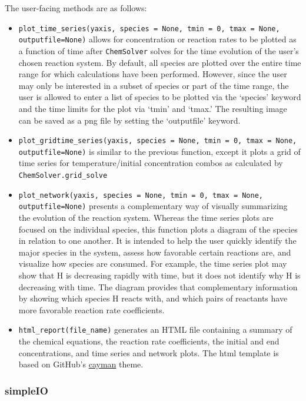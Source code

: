 \documentclass[12pt]{article}
\begin{document}
The user-facing methods are as follows: 
\begin{itemize}
\item \texttt{plot\_time\_series(yaxis, species = None, tmin = 0, tmax = None, outputfile=None)} allows for concentration or reaction rates to be plotted as a function of time after \texttt{ChemSolver} solves for the time evolution of the user's chosen reaction system. By default, all species are plotted over the entire time range for which calculations have been performed. However, since the user may only be interested in a subset of species or part of the time range, the user is allowed to enter a list of species to be plotted via the `species' keyword and the time limits for the plot via `tmin' and `tmax.' The resulting image can be saved as a png file by setting the `outputfile' keyword. 
\item \texttt{plot\_gridtime\_series(yaxis, species = None, tmin = 0, tmax = None, outputfile=None)} is similar to the previous function, except it plots a grid of time series for temperature/initial concentration combos as calculated by \texttt{ChemSolver.grid\_solve}
\item \texttt{plot\_network(yaxis, species = None, tmin = 0, tmax = None, outputfile=None)} presents a complementary way of visually summarizing the evolution of the reaction system. Whereas the time series plots are focused on the individual species, this function plots a diagram of the species in relation to one another. It is intended to help the user quickly identify the major species in the system, assess how favorable certain reactions are, and visualize how species are consumed. For example, the time series plot may show that H is decreasing rapidly with time, but it does not identify why H is decreasing with time. The diagram provides that complementary information by showing which species H reacts with, and which pairs of reactants have more favorable reaction rate coefficients. 
\item \texttt{html\_report(file\_name)} generates an HTML file containing a summary of the chemical equations, the reaction rate coefficients, the initial and end concentrations, and time series and network plots. The html template is based on GitHub's \href{https://github.com/pages-themes/cayman}{cayman} theme.
\end{itemize}

\subsubsection{simpleIO}
\end{document}
